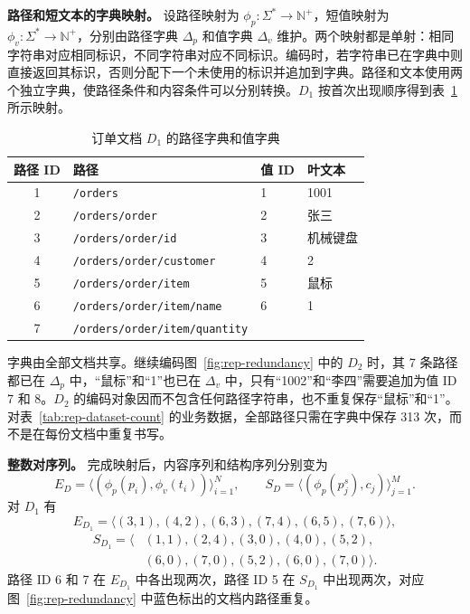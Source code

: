 \textbf{路径和短文本的字典映射。} 设路径映射为 $\phi_p:\Sigma^{*}\to\mathbb{N}^{+}$，短值映射为 $\phi_v:\Sigma^{*}\to\mathbb{N}^{+}$，分别由路径字典 $\Delta_p$ 和值字典 $\Delta_v$ 维护。两个映射都是单射：相同字符串对应相同标识，不同字符串对应不同标识。编码时，若字符串已在字典中则直接返回其标识，否则分配下一个未使用的标识并追加到字典。路径和文本使用两个独立字典，使路径条件和内容条件可以分别转换。$D_1$ 按首次出现顺序得到表~\ref{tab:xml-example-dictionary} 所示映射。

\begin{table}[htbp]
\centering\small
\caption{订单文档 $D_1$ 的路径字典和值字典}
\label{tab:xml-example-dictionary}
\begin{tabular}{clll}
\toprule
路径 ID & 路径 & 值 ID & 叶文本 \\
\midrule
1 & \texttt{/orders} & 1 & 1001 \\
2 & \texttt{/orders/order} & 2 & 张三 \\
3 & \texttt{/orders/order/id} & 3 & 机械键盘 \\
4 & \texttt{/orders/order/customer} & 4 & 2 \\
5 & \texttt{/orders/order/item} & 5 & 鼠标 \\
6 & \texttt{/orders/order/item/name} & 6 & 1 \\
7 & \texttt{/orders/order/item/quantity} & & \\
\bottomrule
\end{tabular}
\end{table}

字典由全部文档共享。继续编码图~\ref{fig:rep-redundancy} 中的 $D_2$ 时，其 7 条路径都已在 $\Delta_p$ 中，“鼠标”和“1”也已在 $\Delta_v$ 中，只有“1002”和“李四”需要追加为值 ID 7 和 8。$D_2$ 的编码对象因而不包含任何路径字符串，也不重复保存“鼠标”和“1”。对表~\ref{tab:rep-dataset-count} 的业务数据，全部路径只需在字典中保存 313 次，而不是在每份文档中重复书写。

\textbf{整数对序列。} 完成映射后，内容序列和结构序列分别变为
\[
E_D=\langle(\phi_p(p_i),\phi_v(t_i))\rangle_{i=1}^{N},\qquad
S_D=\langle(\phi_p(p^{s}_j),c_j)\rangle_{j=1}^{M}.
\]
对 $D_1$ 有
\[
E_{D_1}=\langle(3,1),(4,2),(6,3),(7,4),(6,5),(7,6)\rangle,
\]
\[
\begin{aligned}
S_{D_1}=\langle &(1,1),(2,4),(3,0),(4,0),(5,2),\\
             &(6,0),(7,0),(5,2),(6,0),(7,0)\rangle.
\end{aligned}
\]
路径 ID 6 和 7 在 $E_{D_1}$ 中各出现两次，路径 ID 5 在 $S_{D_1}$ 中出现两次，对应图~\ref{fig:rep-redundancy} 中蓝色标出的文档内路径重复。


